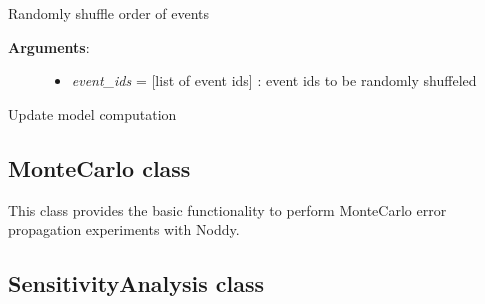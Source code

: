 \documentclass[a4paper,10pt,english]{sphinxmanual}
\begin{document}
\begin{fulllineitems}
\begin{fulllineitems}
\label{pynoddy:pynoddy.experiment.Experiment.shuffle_event_order}
Randomly shuffle order of events
\begin{description}
\item[{\textbf{Arguments}:}] \leavevmode\begin{itemize}
\item {} 
\emph{event\_ids} = {[}list of event ids{]} : event ids to be randomly shuffeled

\end{itemize}

\end{description}

\end{fulllineitems}


\begin{fulllineitems}
\label{pynoddy:pynoddy.experiment.Experiment.update}
Update model computation

\end{fulllineitems}


\begin{fulllineitems}
\label{pynoddy:pynoddy.experiment.Experiment.write_parameter_changes}
\end{fulllineitems}


\end{fulllineitems}



\subsection{MonteCarlo class}
\label{pynoddy:montecarlo-class}
This class provides the basic functionality to perform MonteCarlo error propagation
experiments with Noddy.


\subsection{SensitivityAnalysis class}
\label{pynoddy:sensitivityanalysis-class}
\end{document}
